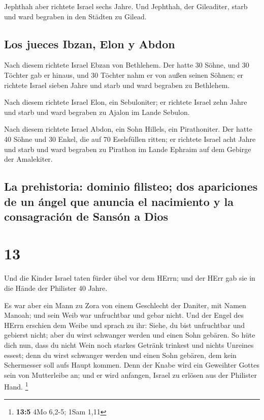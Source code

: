  Jephthah aber richtete Israel sechs Jahre. Und Jephthah,
der Gileaditer, starb und ward begraben in den Städten zu Gilead.

\hypertarget{los-jueces-ibzan-elon-y-abdon}{%
\subsection{Los jueces Ibzan, Elon y
Abdon}\label{los-jueces-ibzan-elon-y-abdon}}

 Nach diesem richtete Israel Ebzan von Bethlehem.
 Der hatte 30 Söhne, und 30 Töchter gab er hinaus, und 30
Töchter nahm er von außen seinen Söhnen; er richtete Israel sieben Jahre
 und starb und ward begraben zu Bethlehem.

 Nach diesem richtete Israel Elon, ein Sebuloniter; er
richtete Israel zehn Jahre  und starb und ward begraben
zu Ajalon im Lande Sebulon.

 Nach diesem richtete Israel Abdon, ein Sohn Hillels, ein
Pirathoniter.  Der hatte 40 Söhne und 30 Enkel, die auf
70 Eselsfüllen ritten; er richtete Israel acht Jahre  und
starb und ward begraben zu Pirathon im Lande Ephraim auf dem Gebirge der
Amalekiter.

\hypertarget{la-prehistoria-dominio-filisteo-dos-apariciones-de-un-uxe1ngel-que-anuncia-el-nacimiento-y-la-consagraciuxf3n-de-sansuxf3n-a-dios}{%
\subsection{La prehistoria: dominio filisteo; dos apariciones de un
ángel que anuncia el nacimiento y la consagración de Sansón a
Dios}\label{la-prehistoria-dominio-filisteo-dos-apariciones-de-un-uxe1ngel-que-anuncia-el-nacimiento-y-la-consagraciuxf3n-de-sansuxf3n-a-dios}}

\hypertarget{section-12}{%
\section{13}\label{section-12}}

 Und die Kinder Israel taten fürder übel vor dem HErrn;
und der HErr gab sie in die Hände der Philister 40 Jahre.

 Es war aber ein Mann zu Zora von einem Geschlecht der
Daniter, mit Namen Manoah; und sein Weib war unfruchtbar und gebar
nicht.  Und der Engel des HErrn erschien dem Weibe und
sprach zu ihr: Siehe, du bist unfruchtbar und gebierst nicht; aber du
wirst schwanger werden und einen Sohn gebären.  So hüte
dich nun, dass du nicht Wein noch starkes Getränk trinkest und nichts
Unreines essest;  denn du wirst schwanger werden und einen
Sohn gebären, dem kein Schermesser soll aufs Haupt kommen. Denn der
Knabe wird ein Geweihter Gottes sein von Mutterleibe an; und er wird
anfangen, Israel zu erlösen aus der Philister Hand. \footnote{\textbf{13:5}
  4Mo 6,2-5; 1Sam 1,11}

